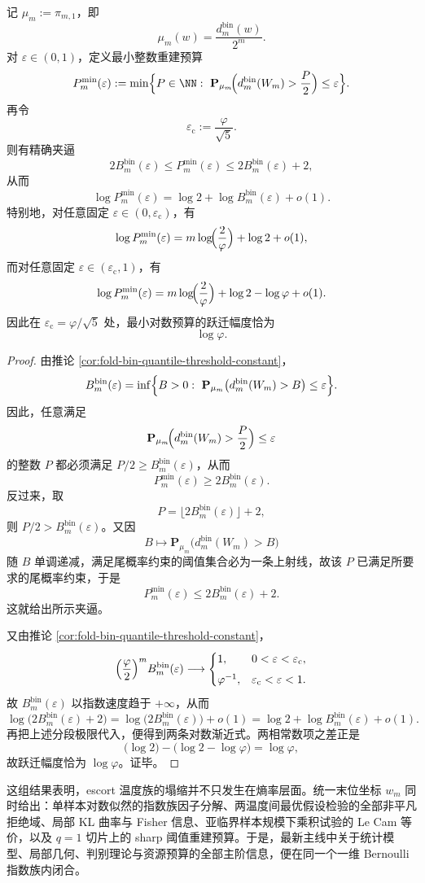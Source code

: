 \begin{theorem}\label{thm:xi-time-part9ob-binfold-sharp-threshold-budget}
记 \(\mu_m:=\pi_{m,1}\)，即
\[
\mu_m(w)=\frac{d_m^{\mathrm{bin}}(w)}{2^m}.
\]
对 \(\varepsilon\in(0,1)\)，定义最小整数重建预算
\[
P_m^{\min}(\varepsilon):=
\min\Bigl\{
P\in\NN:\ 
\mathbf P_{\mu_m}\!\Bigl(d_m^{\mathrm{bin}}(W_m)>\frac{P}{2}\Bigr)\le \varepsilon
\Bigr\}.
\]
再令
\[
\varepsilon_{\mathrm c}:=\frac{\varphi}{\sqrt5}.
\]
则有精确夹逼
\[
2B_m^{\mathrm{bin}}(\varepsilon)
\le
P_m^{\min}(\varepsilon)
\le
2B_m^{\mathrm{bin}}(\varepsilon)+2,
\]
从而
\[
\log P_m^{\min}(\varepsilon)
=
\log 2+\log B_m^{\mathrm{bin}}(\varepsilon)+o(1).
\]
特别地，对任意固定 \(\varepsilon\in(0,\varepsilon_{\mathrm c})\)，有
\[
\log P_m^{\min}(\varepsilon)
=
m\log\!\Bigl(\frac{2}{\varphi}\Bigr)+\log 2+o(1),
\]
而对任意固定 \(\varepsilon\in(\varepsilon_{\mathrm c},1)\)，有
\[
\log P_m^{\min}(\varepsilon)
=
m\log\!\Bigl(\frac{2}{\varphi}\Bigr)+\log 2-\log\varphi+o(1).
\]
因此在 \(\varepsilon_{\mathrm c}=\varphi/\sqrt5\) 处，最小对数预算的跃迁幅度恰为
\[
\log\varphi.
\]
\end{theorem}
\begin{proof}
由推论 \ref{cor:fold-bin-quantile-threshold-constant}，
\[
B_m^{\mathrm{bin}}(\varepsilon)
=
\inf\Bigl\{B>0:\ 
\mathbf P_{\mu_m}\bigl(d_m^{\mathrm{bin}}(W_m)>B\bigr)\le \varepsilon
\Bigr\}.
\]
因此，任意满足
\[
\mathbf P_{\mu_m}\!\Bigl(d_m^{\mathrm{bin}}(W_m)>\frac{P}{2}\Bigr)\le \varepsilon
\]
的整数 \(P\) 都必须满足 \(P/2\ge B_m^{\mathrm{bin}}(\varepsilon)\)，从而
\[
P_m^{\min}(\varepsilon)\ge 2B_m^{\mathrm{bin}}(\varepsilon).
\]
反过来，取
\[
P=\lfloor 2B_m^{\mathrm{bin}}(\varepsilon)\rfloor+2,
\]
则 \(P/2>B_m^{\mathrm{bin}}(\varepsilon)\)。又因
\[
B\longmapsto \mathbf P_{\mu_m}\bigl(d_m^{\mathrm{bin}}(W_m)>B\bigr)
\]
随 \(B\) 单调递减，满足尾概率约束的阈值集合必为一条上射线，故该 \(P\) 已满足所要求的尾概率约束，于是
\[
P_m^{\min}(\varepsilon)\le 2B_m^{\mathrm{bin}}(\varepsilon)+2.
\]
这就给出所示夹逼。

又由推论 \ref{cor:fold-bin-quantile-threshold-constant}，
\[
\Bigl(\frac{\varphi}{2}\Bigr)^m B_m^{\mathrm{bin}}(\varepsilon)\longrightarrow
\begin{cases}
1,& 0<\varepsilon<\varepsilon_{\mathrm c},\\[4pt]
\varphi^{-1},& \varepsilon_{\mathrm c}<\varepsilon<1.
\end{cases}
\]
故 \(B_m^{\mathrm{bin}}(\varepsilon)\) 以指数速度趋于 \(+\infty\)，从而
\[
\log\!\bigl(2B_m^{\mathrm{bin}}(\varepsilon)+2\bigr)
=
\log\!\bigl(2B_m^{\mathrm{bin}}(\varepsilon)\bigr)+o(1)
=
\log 2+\log B_m^{\mathrm{bin}}(\varepsilon)+o(1).
\]
再把上述分段极限代入，便得到两条对数渐近式。两相常数项之差正是
\[
\bigl(\log 2\bigr)-\bigl(\log 2-\log\varphi\bigr)=\log\varphi,
\]
故跃迁幅度恰为 \(\log\varphi\)。证毕。
\end{proof}

\noindent 这组结果表明，escort 温度族的塌缩并不只发生在熵率层面。统一末位坐标 \(w_m\) 同时给出：单样本对数似然的指数族因子分解、两温度间最优假设检验的全部非平凡拒绝域、局部 KL 曲率与 Fisher 信息、亚临界样本规模下乘积试验的 Le Cam 等价，以及 \(q=1\) 切片上的 sharp 阈值重建预算。于是，最新主线中关于统计模型、局部几何、判别理论与资源预算的全部主阶信息，便在同一个一维 Bernoulli 指数族内闭合。

\endinput
